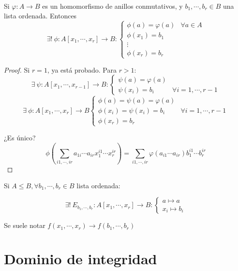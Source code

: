 \begin{nprop}
  Si $\varphi : A \longrightarrow B$ es un homomorfismo de anillos conmutativos, y $b_1,\cdots, b_r \in B$ una lista ordenada. Entonces
  \[
    \exists!\ \phi : A[x_1,\cdots,x_r] \longrightarrow B :\begin{cases}
      \phi(a) = \varphi(a) & \forall a\in A\\
      \phi(x_1) = b_1\\
      \vdots\\
      \phi(x_r) = b_r
    \end{cases}
  \]
\end{nprop}

\begin{proof}
  Si $r=1$, ya está probado. Para $r>1$:
  \[
    \exists\ \psi : A[x_1,\cdots,x_{r-1}] \longrightarrow B : \begin{cases}
      \psi(a) = \varphi(a)\\
      \psi(x_i) = b_i & \forall i=1,\cdots,r-1
    \end{cases}
  \]
  \[  \exists\ \phi : A[x_1,\cdots,x_r] \longrightarrow B \begin{cases}
      \phi(a) = \psi(a) = \varphi(a)\\
      \phi(x_i) = \psi(x_i) = b_i &\forall i=1,\cdots,r-1\\
      \phi(x_r) = b_r
    \end{cases}
  \]

  ¿Es único?
  \[
    \phi\left(\sum_{i1,\cdots,ir} a_{1i}\cdots a_{ir}x_1^{i1}\cdots x_r^{ir} \right)= \sum _{i1,\cdots,ir} \varphi(a_{i1}\cdots a_{ir})b_1^{i1}\cdots b_r^{ir}
  \]
\end{proof}

\begin{nprop}
	Si $A\leq B, \forall b_1,\cdots,b_r \in B$ lista ordenada:

\[
\exists !\ E_{b_1,\cdots,b_r}: A[x_1,\cdots,x_r] \to B :
\begin{cases}
	a \mapsto a\\
	x_i \mapsto b_i
\end{cases}
\]

Se suele notar $f(x_1,\cdots,x_r) \to f(b_1,\cdots,b_r)$
\end{nprop}

\section{Dominio de integridad}

